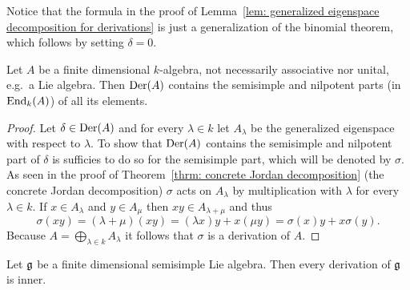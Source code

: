 \begin{rem}
 Notice that the formula in the proof of Lemma~\ref{lem: generalized eigenspace decomposition for derivations} is just a generalization of the binomial theorem, which follows by setting $\delta = 0$.
\end{rem}


\begin{lem}
 Let $A$ be a finite dimensional $k$-algebra, not necessarily associative nor unital, e.g.\ a Lie algebra. Then $\operatorname{Der}(A)$ contains the semisimple and nilpotent parts (in $\operatorname{End}_k(A)$) of all its elements.
\end{lem}
\begin{proof}
 Let $\delta \in \operatorname{Der}(A)$ and for every $\lambda \in k$ let $A_\lambda$ be the generalized eigenspace with respect to $\lambda$. To show that $\operatorname{Der}(A)$ contains the semisimple and nilpotent part of $\delta$ is sufficies to do so for the semisimple part, which will be denoted by $\sigma$. As seen in the proof of Theorem~\ref{thrm: concrete Jordan decomposition} (the concrete Jordan decomposition) $\sigma$ acts on $A_\lambda$ by multiplication with $\lambda$ for every $\lambda \in k$. If $x \in A_\lambda$ and $y \in A_\mu$ then $xy \in A_{\lambda + \mu}$ and thus
 \[
  \sigma(xy)
  = (\lambda + \mu)(xy)
  = (\lambda x)y + x(\mu y)
  = \sigma(x)y + x\sigma(y).
 \]
 Because $A = \bigoplus_{\lambda \in k} A_\lambda$ it follows that $\sigma$ is a derivation of $A$.
\end{proof}



\begin{lem}
 Let $\mathfrak{g}$ be a finite dimensional semisimple Lie algebra. Then every derivation of $\mathfrak{g}$ is inner.
\end{lem}
